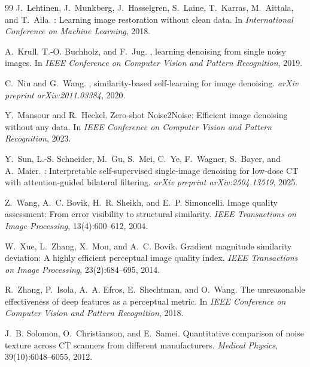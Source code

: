 \documentclass[10pt,twocolumn]{article}
\begin{document}
\begin{thebibliography}{99}
J.~Lehtinen, J.~Munkberg, J.~Hasselgren, S.~Laine, T.~Karras, M.~Aittala,
  and T.~Aila.
: Learning image restoration without clean data.
\newblock In \emph{International Conference on Machine Learning}, 2018.

A.~Krull, T.-O. Buchholz, and F.~Jug.
, learning denoising from single noisy images.
\newblock In \emph{IEEE Conference on Computer Vision and Pattern Recognition},
  2019.

C.~Niu and G.~Wang.
, similarity-based self-learning for image denoising.
\newblock \emph{arXiv preprint arXiv:2011.03384}, 2020.

Y.~Mansour and R.~Heckel.
\newblock Zero-shot {Noise2Noise}: Efficient image denoising without any data.
\newblock In \emph{IEEE Conference on Computer Vision and Pattern Recognition},
  2023.

Y.~Sun, L.-S. Schneider, M.~Gu, S.~Mei, C.~Ye, F.~Wagner, S.~Bayer, and
  A.~Maier.
: Interpretable self-supervised single-image denoising
  for low-dose {CT} with attention-guided bilateral filtering.
\newblock \emph{arXiv preprint arXiv:2504.13519}, 2025.

Z.~Wang, A.~C. Bovik, H.~R. Sheikh, and E.~P. Simoncelli.
\newblock Image quality assessment: From error visibility to structural
  similarity.
\newblock \emph{IEEE Transactions on Image Processing}, 13(4):600--612, 2004.

W.~Xue, L.~Zhang, X.~Mou, and A.~C. Bovik.
\newblock Gradient magnitude similarity deviation: A highly efficient perceptual
  image quality index.
\newblock \emph{IEEE Transactions on Image Processing}, 23(2):684--695, 2014.

R.~Zhang, P.~Isola, A.~A. Efros, E.~Shechtman, and O.~Wang.
\newblock The unreasonable effectiveness of deep features as a perceptual
  metric.
\newblock In \emph{IEEE Conference on Computer Vision and Pattern Recognition},
  2018.

J.~B. Solomon, O.~Christianson, and E.~Samei.
\newblock Quantitative comparison of noise texture across {CT} scanners from
  different manufacturers.
\newblock \emph{Medical Physics}, 39(10):6048--6055, 2012.

\end{thebibliography}
\end{document}
